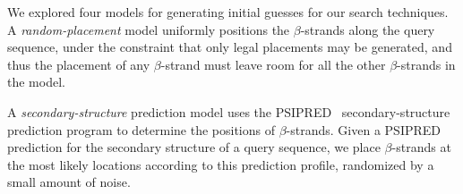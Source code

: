 \documentclass[blockstyle,times,preprint]{sigplanconf}
\begin{document}





We explored four models for generating initial guesses for our search
techniques.
A \emph{random-placement} model uniformly positions 
the $\beta$-strands
along the query sequence, under the constraint that only legal placements
may be generated, and thus the placement of any $\beta$-strand must leave 
room for all the other $\beta$-strands in the model.

A \emph{secondary-structure} prediction model uses the 
PSIPRED~\cite{McGuffin:2000wx} 
secondary-structure
prediction program to determine the positions of $\beta$-strands.
Given a PSIPRED prediction for the secondary structure of a query sequence,
we place $\beta$-strands at the most likely locations according to this
prediction profile, randomized by a small amount of noise.
  
\end{document}
